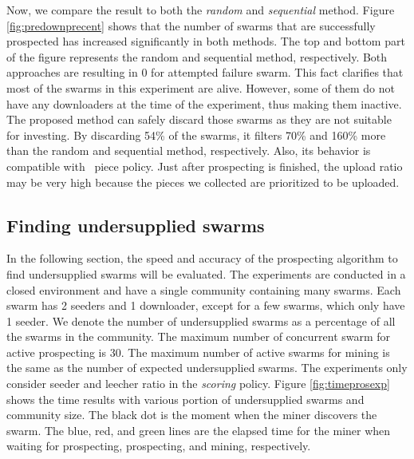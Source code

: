 Now, we compare the result to both the \textit{random} and \textit{sequential} method. Figure \ref{fig:predownprecent} shows that the number of swarms that are successfully prospected has increased significantly in both methods. The top and bottom part of the figure represents the random and sequential method, respectively. Both approaches are resulting in 0 for attempted failure swarm. This fact clarifies that most of the swarms in this experiment are alive. However, some of them do not have any downloaders at the time of the experiment, thus making them inactive. The proposed method can safely discard those swarms as they are not suitable for investing. By discarding 54\% of the swarms, it filters 70\% and 160\% more than the random and sequential method, respectively. Also, its behavior is compatible with \bt~piece policy. Just after prospecting is finished, the upload ratio may be very high because the pieces we collected are prioritized to be uploaded.

\subsection{Finding undersupplied swarms}
In the following section, the speed and accuracy of the prospecting algorithm to find undersupplied swarms will be evaluated. The experiments are conducted in a closed environment and have a single community containing many swarms. Each swarm has 2 seeders and 1 downloader, except for a few swarms, which only have 1 seeder. We denote the number of undersupplied swarms as a percentage of all the swarms in the community. The maximum number of concurrent swarm for active prospecting is 30. The maximum number of active swarms for mining is the same as the number of expected undersupplied swarms. The experiments only consider seeder and leecher ratio in the \textit{scoring} policy. Figure \ref{fig:timeprosexp} shows the time results with various portion of undersupplied swarms and community size. The black dot is the moment when the miner discovers the swarm. The blue, red, and green lines are the elapsed time for the miner when waiting for prospecting, prospecting, and mining, respectively.

